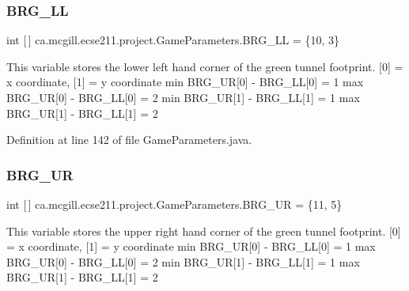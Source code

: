 \subsubsection{\texorpdfstring{B\+R\+G\+\_\+\+LL}{BRG\_LL}}
{\footnotesize\ttfamily int \mbox{[}$\,$\mbox{]} ca.\+mcgill.\+ecse211.\+project.\+Game\+Parameters.\+B\+R\+G\+\_\+\+LL = \{10, 3\}\hspace{0.3cm}{\ttfamily [static]}}

This variable stores the lower left hand corner of the green tunnel footprint. \mbox{[}0\mbox{]} = x coordinate, \mbox{[}1\mbox{]} = y coordinate min B\+R\+G\+\_\+\+UR\mbox{[}0\mbox{]} -\/ B\+R\+G\+\_\+\+LL\mbox{[}0\mbox{]} = 1 max B\+R\+G\+\_\+\+UR\mbox{[}0\mbox{]} -\/ B\+R\+G\+\_\+\+LL\mbox{[}0\mbox{]} = 2 min B\+R\+G\+\_\+\+UR\mbox{[}1\mbox{]} -\/ B\+R\+G\+\_\+\+LL\mbox{[}1\mbox{]} = 1 max B\+R\+G\+\_\+\+UR\mbox{[}1\mbox{]} -\/ B\+R\+G\+\_\+\+LL\mbox{[}1\mbox{]} = 2 

Definition at line 142 of file Game\+Parameters.\+java.

\mbox{\label{classca_1_1mcgill_1_1ecse211_1_1project_1_1_game_parameters_a644c339e7b0f11c5780f9c7de34e1e07}} 
\subsubsection{\texorpdfstring{B\+R\+G\+\_\+\+UR}{BRG\_UR}}
{\footnotesize\ttfamily int \mbox{[}$\,$\mbox{]} ca.\+mcgill.\+ecse211.\+project.\+Game\+Parameters.\+B\+R\+G\+\_\+\+UR = \{11, 5\}\hspace{0.3cm}{\ttfamily [static]}}

This variable stores the upper right hand corner of the green tunnel footprint. \mbox{[}0\mbox{]} = x coordinate, \mbox{[}1\mbox{]} = y coordinate min B\+R\+G\+\_\+\+UR\mbox{[}0\mbox{]} -\/ B\+R\+G\+\_\+\+LL\mbox{[}0\mbox{]} = 1 max B\+R\+G\+\_\+\+UR\mbox{[}0\mbox{]} -\/ B\+R\+G\+\_\+\+LL\mbox{[}0\mbox{]} = 2 min B\+R\+G\+\_\+\+UR\mbox{[}1\mbox{]} -\/ B\+R\+G\+\_\+\+LL\mbox{[}1\mbox{]} = 1 max B\+R\+G\+\_\+\+UR\mbox{[}1\mbox{]} -\/ B\+R\+G\+\_\+\+LL\mbox{[}1\mbox{]} = 2 

